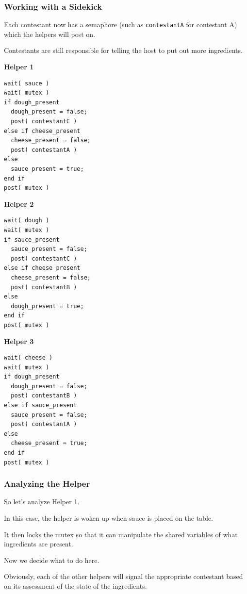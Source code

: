\begin{frame}[fragile]
\frametitle{Working with a Sidekick}

Each contestant now has a semaphore (such as \texttt{contestantA} for contestant A) which the helpers will post on. 

Contestants are still responsible for telling the host to put out more ingredients.

\begin{multicols}{3}
\textbf{Helper 1}
\begin{lstlisting}
wait( sauce )
wait( mutex )
if dough_present  
  dough_present = false;
  post( contestantC )
else if cheese_present
  cheese_present = false;
  post( contestantA )
else
  sauce_present = true;
end if  
post( mutex )
\end{lstlisting}
\columnbreak
\textbf{Helper 2}
\begin{lstlisting}
wait( dough )
wait( mutex )
if sauce_present  
  sauce_present = false;
  post( contestantC )
else if cheese_present
  cheese_present = false;
  post( contestantB )
else
  dough_present = true;
end if  
post( mutex )
\end{lstlisting}
\columnbreak
\textbf{Helper 3}
\begin{lstlisting}
wait( cheese )
wait( mutex )
if dough_present  
  dough_present = false;
  post( contestantB )
else if sauce_present
  sauce_present = false;
  post( contestantA )
else
  cheese_present = true;
end if  
post( mutex )
\end{lstlisting}
\end{multicols}

\end{frame}

\begin{frame}
\frametitle{Analyzing the Helper}

So let's analyze Helper 1.

In this case, the helper is woken up when sauce is placed on the table. 

It then locks the mutex so that it can manipulate the shared variables of what ingredients are present. 

Now we decide what to do here.

Obviously, each of the other helpers will signal the appropriate contestant based on its assessment of the state of the ingredients. 

\end{frame}


